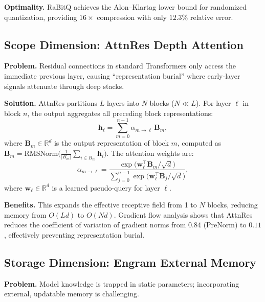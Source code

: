 \documentclass[twocolumn]{article}
\begin{document}
\textbf{Optimality.} RaBitQ achieves the Alon--Klartag lower bound for randomized quantization, providing $16\times$ compression with only $12.3\%$ relative error.

\subsection{Scope Dimension: AttnRes Depth Attention}
\label{sec:adn-attnres}

\textbf{Problem.} Residual connections in standard Transformers only access the immediate previous layer, causing ``representation burial'' where early-layer signals attenuate through deep stacks.

\textbf{Solution.} AttnRes \cite{attnres} partitions $L$ layers into $N$ blocks ($N \ll L$). For layer $\ell$ in block $n$, the output aggregates all preceding block representations:
\begin{equation}
\mathbf{h}_\ell = \sum_{m=0}^{n-1} \alpha_{m \rightarrow \ell} \, \mathbf{B}_m,
\label{eq:attnres-base}
\end{equation}
where $\mathbf{B}_m \in \mathbb{R}^d$ is the output representation of block $m$, computed as $\mathbf{B}_m = \mathrm{RMSNorm}\bigl(\frac{1}{|B_m|} \sum_{i \in B_m} \mathbf{h}_i\bigr)$. The attention weights are:
\begin{equation}
\alpha_{m \rightarrow \ell} = \frac{\exp\bigl(\mathbf{w}_\ell^\top \mathbf{B}_m / \sqrt{d}\bigr)}{\sum_{j=0}^{n-1} \exp\bigl(\mathbf{w}_\ell^\top \mathbf{B}_j / \sqrt{d}\bigr)},
\end{equation}
where $\mathbf{w}_\ell \in \mathbb{R}^d$ is a learned pseudo-query for layer $\ell$.

\textbf{Benefits.} This expands the effective receptive field from 1 to $N$ blocks, reducing memory from $O(Ld)$ to $O(Nd)$. Gradient flow analysis shows that AttnRes reduces the coefficient of variation of gradient norms from $0.84$ (PreNorm) to $0.11$, effectively preventing representation burial.

\subsection{Storage Dimension: Engram External Memory}
\label{sec:adn-engram}

\textbf{Problem.} Model knowledge is trapped in static parameters; incorporating external, updatable memory is challenging.
\end{document}
